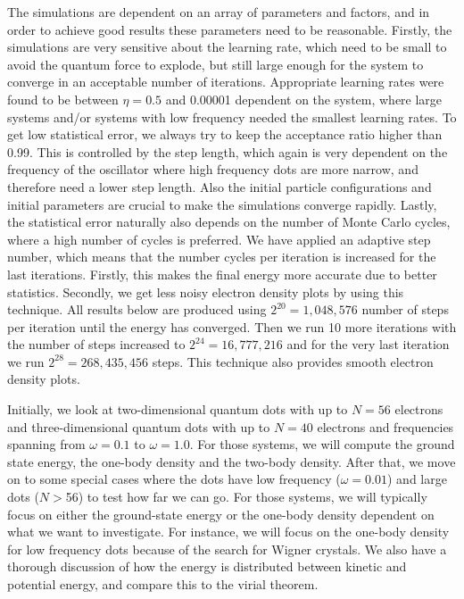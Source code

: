 The simulations are dependent on an array of parameters and factors, and in order to achieve good results these parameters need to be reasonable. Firstly, the simulations are very sensitive about the learning rate, which need to be small to avoid the quantum force to explode, but still large enough for the system to converge in an acceptable number of iterations. Appropriate learning rates were found to be between $\eta=0.5$ and 0.00001 dependent on the system, where large systems and/or systems with low frequency needed the smallest learning rates. To get low statistical error, we always try to keep the acceptance ratio higher than 0.99. This is controlled by the step length, which again is very dependent on the frequency of the oscillator where high frequency dots are more narrow, and therefore need a lower step length. Also the initial particle configurations and initial parameters are crucial to make the simulations converge rapidly. Lastly, the statistical error naturally also depends on the number of Monte Carlo cycles, where a high number of cycles is preferred. We have applied an adaptive step number, which means that the number cycles per iteration is increased for the last iterations. Firstly, this makes the final energy more accurate due to better statistics. Secondly, we get less noisy electron density plots by using this technique. All results below are produced using $2^{20}=1,048,576$ number of steps per iteration until the energy has converged. Then we run 10 more iterations with the number of steps increased to $2^{24}=16,777,216$ and for the very last iteration we run $2^{28}=268,435,456$ steps. This technique also provides smooth electron density plots.

Initially, we look at two-dimensional quantum dots with up to $N=56$ electrons and three-dimensional quantum dots with up to $N=40$ electrons and frequencies spanning from  $\omega=0.1$ to $\omega=1.0$. For those systems, we will compute the ground state energy, the one-body density and the two-body density. After that, we move on to some special cases where the dots have low frequency ($\omega=0.01$) and large dots ($N>$56) to test how far we can go. For those systems, we will typically focus on either the ground-state energy or the one-body density dependent on what we want to investigate. For instance, we will focus on the one-body density for low frequency dots because of the search for Wigner crystals. We also have a thorough discussion of how the energy is distributed between kinetic and potential energy, and compare this to the virial theorem.

